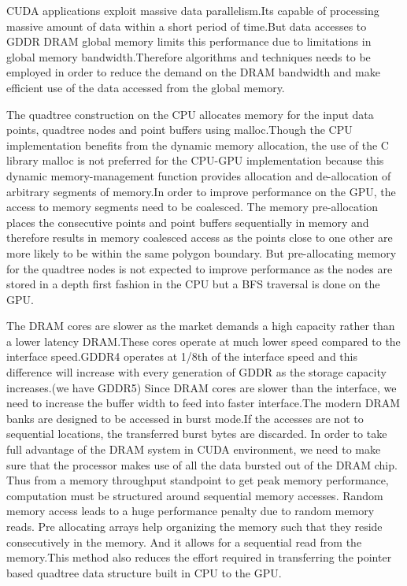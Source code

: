 \documentclass{article}
\begin{document}
CUDA applications exploit massive data parallelism.Its capable of processing massive amount of data within a short period of time.But data accesses to GDDR DRAM global memory limits this performance due to limitations in global memory bandwidth.Therefore algorithms and techniques needs to be employed in order to reduce the demand on the DRAM bandwidth  and make efficient use of the data accessed from the global memory.

The quadtree construction on the CPU allocates memory for the input data points, quadtree nodes and point buffers using malloc.Though the CPU implementation benefits from the dynamic memory allocation, the use of the C library malloc is not preferred for the CPU-GPU implementation because this dynamic memory-management function provides allocation and de-allocation of arbitrary segments of memory.In order to improve performance on the GPU, the access to memory segments need to be coalesced. The memory pre-allocation places the consecutive points and point buffers sequentially in memory and therefore results in memory coalesced access as the points close to one other are more likely to be within the same polygon boundary. But pre-allocating memory for the  quadtree nodes is not expected to improve performance as the nodes are stored in a depth first fashion in the CPU but a BFS traversal is  done on the GPU.

The DRAM cores are slower as the market demands a high capacity rather than a lower latency DRAM.These cores operate at much lower speed compared to the interface speed.GDDR4 operates at 1/8th of the interface speed and this difference will increase with every generation of GDDR as the storage capacity increases.(we have GDDR5)
Since DRAM cores are slower than the interface, we need to increase the buffer width to feed into faster interface.The modern DRAM banks are designed to be accessed in burst mode.If the accesses are not to sequential locations, the transferred burst bytes are discarded.
In order to take full advantage of the DRAM system in CUDA environment, we need to make sure that the processor makes use of all the data bursted out of the DRAM chip. 
Thus from a memory throughput standpoint to get peak memory performance, computation must be structured around sequential memory accesses. Random memory access leads to a huge performance penalty due to random memory reads. 
Pre allocating arrays help organizing the memory such that they reside consecutively in the memory. And it allows for a sequential read from the memory.This method also reduces the effort required in transferring the pointer based quadtree data structure built in CPU to the GPU.
 
\end{document}
